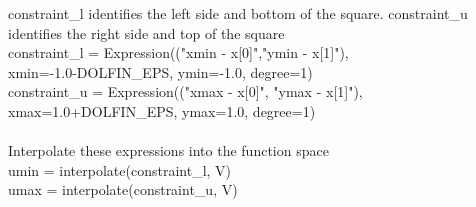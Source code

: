 \documentclass[12pt,3p]{article}
\begin{document}
{\selectfont constraint\_l} identifies the left side and bottom of the square. {\selectfont constraint\_u} identifies the right side and top of the square \\
{\selectfont
constraint\_l = Expression(("xmin - x[0]","ymin - x[1]"), \\
\indent \indent \indent \indent \indent \indent \indent \indent \indent \indent \indent xmin=-1.0-DOLFIN\_EPS, ymin=-1.0, degree=1) \\ 
constraint\_u = Expression(("xmax - x[0]", "ymax - x[1]"), \\
\indent \indent \indent \indent \indent \indent \indent \indent \indent \indent \indent xmax=1.0+DOLFIN\_EPS,  ymax=1.0, degree=1) \\ \\
}
Interpolate these expressions into the function space \\
{\selectfont
umin = interpolate(constraint\_l, V) \\
umax = interpolate(constraint\_u, V)
}
\end{document}

